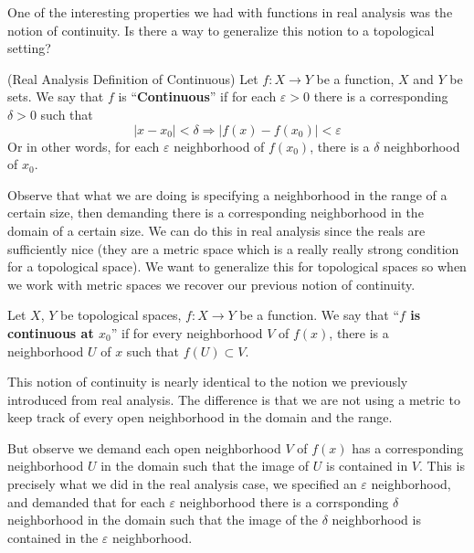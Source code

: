 \begin{prob}
One of the interesting properties we had with functions in real
analysis was the notion of continuity. Is there a way to generalize
this notion to a topological setting?
\end{prob}
\begin{defn}{(Real Analysis Definition of Continuous)}
Let $f:X\to Y$ be a function, $X$ and $Y$ be sets. We say that $f$ is
``\textbf{Continuous}'' if for each $\varepsilon>0$ there is a
corresponding $\delta>0$ such that
\begin{equation}
|x-x_{0}|<\delta\Rightarrow|f(x)-f(x_0)|<\varepsilon
\end{equation}
Or in other words, for each $\varepsilon$ neighborhood of $f(x_0)$,
there is a $\delta$ neighborhood of $x_0$.
\end{defn}
\begin{rmk}
Observe that what we are doing is specifying a neighborhood in the
range of a certain size, then demanding there is a corresponding
neighborhood in the domain of a certain size. We can do this in real
analysis since the reals are sufficiently nice (they are a metric
space which is a really really strong condition for a topological
space). We want to generalize this for topological spaces so when we
work with metric spaces we recover our previous notion of continuity.
\end{rmk}
\begin{defn}
Let $X$, $Y$ be topological spaces, $f:X\to Y$ be a function. We say
that ``\textbf{$f$ is continuous at $x_0$}'' if for every neighborhood
$V$ of $f(x)$, there is a neighborhood $U$ of $x$ such that
$f(U)\subset V$.
\end{defn}
\begin{rmk}
This notion of continuity is nearly identical to the notion we
previously introduced from real analysis. The difference is that we
are not using a metric to keep track of every open neighborhood in the
domain and the range.

But observe we demand each open neighborhood $V$ of $f(x)$ has a
corresponding neighborhood $U$ in the domain such that the image of
$U$ is contained in $V$. This is precisely what we did in the real
analysis case, we specified an $\varepsilon$ neighborhood, and
demanded that for each $\varepsilon$ neighborhood there is a
corrsponding $\delta$ neighborhood in the domain such that the image
of the $\delta$ neighborhood is contained in the $\varepsilon$
neighborhood.
\end{rmk}


